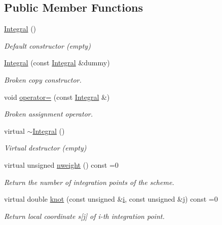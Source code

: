\subsection*{Public Member Functions}
\begin{DoxyCompactItemize}
\item 
\hyperlink{classoomph_1_1Integral_a68e50805e1859191361da2be4e89b9a8}{Integral} ()
\begin{DoxyCompactList}\small\item\em Default constructor (empty) \end{DoxyCompactList}\item 
\hyperlink{classoomph_1_1Integral_a11de5c0669e8fcecc436564c09ed1d13}{Integral} (const \hyperlink{classoomph_1_1Integral}{Integral} \&dummy)
\begin{DoxyCompactList}\small\item\em Broken copy constructor. \end{DoxyCompactList}\item 
void \hyperlink{classoomph_1_1Integral_aa3f5ba2220febc43ce8e606198d87ef0}{operator=} (const \hyperlink{classoomph_1_1Integral}{Integral} \&)
\begin{DoxyCompactList}\small\item\em Broken assignment operator. \end{DoxyCompactList}\item 
virtual \hyperlink{classoomph_1_1Integral_a61b5870e0953a50d0c678ef59eefe147}{$\sim$\+Integral} ()
\begin{DoxyCompactList}\small\item\em Virtual destructor (empty) \end{DoxyCompactList}\item 
virtual unsigned \hyperlink{classoomph_1_1Integral_a1a270de9d99a1fcf1d25a6c1017f65fa}{nweight} () const =0
\begin{DoxyCompactList}\small\item\em Return the number of integration points of the scheme. \end{DoxyCompactList}\item 
virtual double \hyperlink{classoomph_1_1Integral_a1a2122f99a87c18649bafdd9ed739758}{knot} (const unsigned \&\hyperlink{cfortran_8h_adb50e893b86b3e55e751a42eab3cba82}{i}, const unsigned \&j) const =0
\begin{DoxyCompactList}\small\item\em Return local coordinate s\mbox{[}j\mbox{]} of i-\/th integration point. \end{DoxyCompactList}\item 

\end{DoxyCompactItemize}
